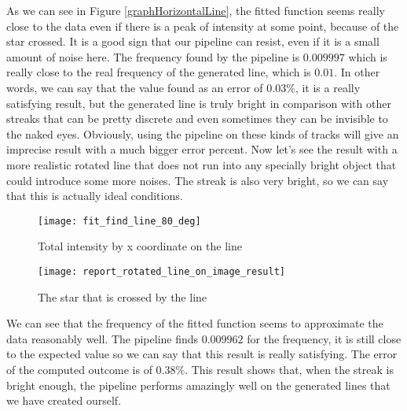 \documentclass[a4paper,12pt,oneside]{report}
\begin{document}
As we can see in Figure \ref{graphHorizontalLine}, the fitted function seems really close to the data even if there is a peak of intensity
at some point, because of the star crossed. It is a good sign that our pipeline can resist, even if it is a small amount of noise here. 
\newline
The frequency found by the pipeline is $0.009997$ which is really close to the real frequency of the generated line, which is $0.01$. 
In other words, we can say that the value found as an error of $0.03\%$, it is a really satisfying result, but the generated line
is truly bright in comparison with other streaks that can be pretty discrete and even sometimes they can be invisible to the naked eyes.
Obviously, using the pipeline on these kinds of tracks will give an imprecise result with a much bigger error percent.
\newline
\newline
Now let's see the result with a more realistic rotated line that does not run into any specially bright object that could introduce some 
more noises. The streak is also very bright, so we can say that this is actually ideal conditions.
\begin{figure}[h]
    \begin{minipage}[c]{.47\linewidth}
        \centering
        \texttt{[image: fit\_find\_line\_80\_deg]}
        \caption{Total intensity by x coordinate on the line}
        \label{graphRotatedLine}
    \end{minipage}
    \hfill
    \begin{minipage}[c]{.47\linewidth}
        \centering
        \texttt{[image: report\_rotated\_line\_on\_image\_result]}
        \caption{The star that is crossed by the line}
    \end{minipage}
\end{figure}
\newline
We can see that the frequency of the fitted function seems to approximate the data reasonably well. The pipeline finds $0.009962$ for the
frequency, it is still close to the expected value so we can say that this result is really satisfying. The error of the computed outcome
is of $0.38\%$. This result shows that, when the streak is bright enough, the pipeline performs amazingly well on the generated lines that
we have created ourself.

\end{document}
